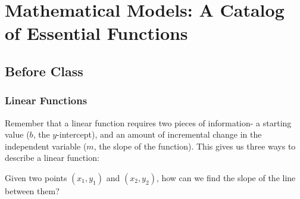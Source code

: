 \documentclass[notes]{subfiles}
\begin{document}
	\fancyhead[LO,RE]{\bfseries \small \currentname}
	\fancyfoot[C]{{}}
	\fancyfoot[RO,LE]{\large \thepage}	%
	
\section*{Mathematical Models: A Catalog of Essential Functions}\label{cs12}
	\subsection*{Before Class}
	\subsubsection*{Linear Functions}
		Remember that a linear function requires two pieces of information- a starting value ($b$, the $y$-intercept), and an amount of incremental change in the independent variable ($m$, the slope of the function).  This gives us three ways to describe a linear function:\\[10pt]
	
		\begin{question}
			Given two points $(x_1,y_1)$ and $(x_2,y_2)$, how can we find the slope of the line between them?
		\end{question}
			\newpage
			
\end{document}
